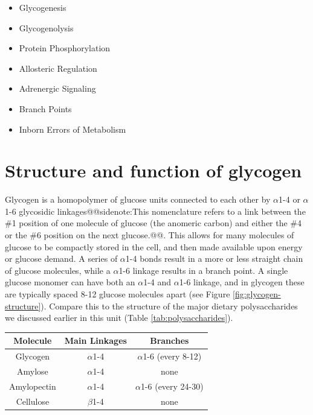 \documentclass{tufte-handout}
\makeatletter
\def\sidenote#1{@@sidenote:#1@@}
\makeatother
\begin{document}
\begin{itemize}
	\item Glycogenesis
	\item Glycogenolysis
	\item Protein Phosphorylation
	\item Allosteric Regulation
	\item Adrenergic Signaling
	\item Branch Points
	\item Inborn Errors of Metabolism
\end{itemize}

\section{Structure and function of glycogen}

Glycogen is a homopolymer of glucose units connected to each other by $\alpha$1-4 or $\alpha$1-6 glycosidic linkages\sidenote{This nomenclature refers to a link between the \#1 position of one molecule of glucose (the anomeric carbon) and either the \#4 or the \#6 position on the next glucose.}.  This allows for many molecules of glucose to be compactly stored in the cell, and then made available upon energy or glucose demand.  A series of $\alpha$1-4 bonds result in a more or less straight chain of glucose molecules, while a $\alpha$1-6 linkage results in a branch point.  A single glucose monomer can have both an $\alpha$1-4 and $\alpha$1-6 linkage, and in glycogen these are typically spaced 8-12 glucose molecules apart (see Figure \ref{fig:glycogen-structure}).  Compare this to the structure of the major dietary polysaccharides we discussed earlier in this unit (Table \ref{tab:polysaccharides}).

\begin{margintable}
\centering
\caption{Structures of some common polysaccharides.  Which of these can be digested by human digestive enzymes?}
\label{tab:polysaccharides}
\begin{tabular}{ccc}
\hline
\textbf {Molecule} & \textbf{Main Linkages} & \textbf{Branches}   \\
\hline
Glycogen & $\alpha$1-4 & $\alpha$1-6 (every 8-12) \\
Amylose & $\alpha$1-4 & none \\
Amylopectin & $\alpha$1-4 & $\alpha$1-6 (every 24-30) \\
Cellulose & $\beta$1-4 & none \\
\hline
\end{tabular}
\end{margintable}
\end{document}
